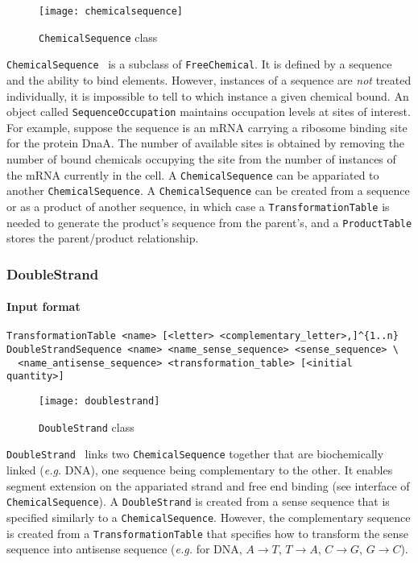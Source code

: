 \begin{figure}[!h]
  \centering
  \texttt{[image: chemicalsequence]}
  \caption{\texttt{ChemicalSequence} class}
  \label{fig:chemical_sequence}
\end{figure}

\texttt{ChemicalSequence}~ is a subclass of \texttt{FreeChemical}. It is defined by a sequence and the ability to bind elements. However, instances of a sequence are \emph{not} treated individually, it is impossible to tell to which instance a given chemical bound. An object called \texttt{SequenceOccupation} maintains occupation levels at sites of interest. For example, suppose the sequence is an mRNA carrying a ribosome binding site for the protein DnaA. The number of available sites is obtained by removing the number of bound chemicals occupying the site from the number of instances of the mRNA currently in the cell. A \texttt{ChemicalSequence} can be appariated to another \texttt{ChemicalSequence}. A \texttt{ChemicalSequence} can be created from a sequence or as a product of another sequence, in which case a \texttt{TransformationTable} is needed to generate the product's sequence from the parent's, and a \texttt{ProductTable} stores the parent/product relationship.

\subsubsection{DoubleStrand}

\paragraph{Input format}
\begin{verbatim}
TransformationTable <name> [<letter> <complementary_letter>,]^{1..n}
DoubleStrandSequence <name> <name_sense_sequence> <sense_sequence> \
  <name_antisense_sequence> <transformation_table> [<initial quantity>]
\end{verbatim}

\begin{figure}[!h]
  \centering
  \texttt{[image: doublestrand]}
  \caption{\texttt{DoubleStrand} class}
  \label{fig:double_strand}
\end{figure}

\texttt{DoubleStrand}~ links two \texttt{ChemicalSequence} together that are biochemically linked (\textit{e.g.} DNA), one sequence being complementary to the other. It enables segment extension on the appariated strand and free end binding (see interface of \texttt{ChemicalSequence}). A \texttt{DoubleStrand} is created from a sense sequence that is specified similarly to a \texttt{ChemicalSequence}. However, the complementary sequence is created from a \texttt{TransformationTable} that specifies how to transform the sense sequence into antisense sequence (\textit{e.g.} for DNA, $A\rightarrow T$, $T\rightarrow A$, $C\rightarrow G$, $G\rightarrow C$).

